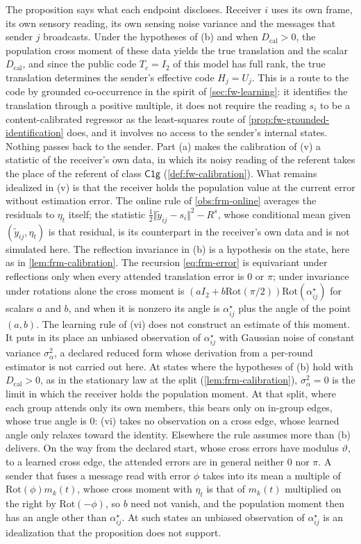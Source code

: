 The proposition says what each endpoint discloses. Receiver $i$ uses its own frame, its own sensory reading, its own sensing noise variance and the messages that sender $j$ broadcasts. Under the hypotheses of (b) and when $D_{\mathrm{cal}}>0$, the population cross moment of these data yields the true translation and the scalar $D_{\mathrm{cal}}$, and since the public code $T_c=I_2$ of this model has full rank, the true translation determines the sender's effective code $H_j=U_j$. This is a route to the code by grounded co-occurrence in the spirit of \cref{sec:fw-learning}: it identifies the translation through a positive multiple, it does not require the reading $s_i$ to be a content-calibrated regressor as the least-squares route of \cref{prop:fw-grounded-identification} does, and it involves no access to the sender's internal states. Nothing passes back to the sender. Part (a) makes the calibration of (v) a statistic of the receiver's own data, in which its noisy reading of the referent takes the place of the referent of class $\mathsf{C1g}$ (\cref{def:fw-calibration}). What remains idealized in (v) is that the receiver holds the population value at the current error without estimation error. The online rule of \cref{obs:frm-online} averages the residuals to $\eta_t$ itself; the statistic $\frac12\Vert\tilde y_{ij}-s_i\Vert^2-R^s$, whose conditional mean given $(\tilde y_{ij},\eta_t)$ is that residual, is its counterpart in the receiver's own data and is not simulated here. The reflection invariance in (b) is a hypothesis on the state, here as in \cref{lem:frm-calibration}. The recursion \eqref{eq:frm-error} is equivariant under reflections only when every attended translation error is $0$ or $\pi$; under invariance under rotations alone the cross moment is $(aI_2+b\mathrm{Rot}(\pi/2))\mathrm{Rot}(\alpha^\star_{ij})$ for scalars $a$ and $b$, and when it is nonzero its angle is $\alpha^\star_{ij}$ plus the angle of the point $(a,b)$. The learning rule of (vi) does not construct an estimate of this moment. It puts in its place an unbiased observation of $\alpha^\star_{ij}$ with Gaussian noise of constant variance $\sigma_\alpha^2$, a declared reduced form whose derivation from a per-round estimator is not carried out here. At states where the hypotheses of (b) hold with $D_{\mathrm{cal}}>0$, as in the stationary law at the split (\cref{lem:frm-calibration}), $\sigma_\alpha^2=0$ is the limit in which the receiver holds the population moment. At that split, where each group attends only its own members, this bears only on in-group edges, whose true angle is $0$: (vi) takes no observation on a cross edge, whose learned angle only relaxes toward the identity. Elsewhere the rule assumes more than (b) delivers. On the way from the declared start, whose cross errors have modulus $\vartheta$, to a learned cross edge, the attended errors are in general neither $0$ nor $\pi$. A sender that fuses a message read with error $\phi$ takes into its mean a multiple of $\mathrm{Rot}(\phi)m_k(t)$, whose cross moment with $\eta_t$ is that of $m_k(t)$ multiplied on the right by $\mathrm{Rot}(-\phi)$, so $b$ need not vanish, and the population moment then has an angle other than $\alpha^\star_{ij}$. At such states an unbiased observation of $\alpha^\star_{ij}$ is an idealization that the proposition does not support.

